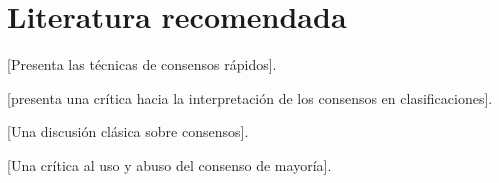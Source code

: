 \section*{Literatura recomendada}

\cite{GoloboffFarris2001} [Presenta las t\'ecnicas de consensos r\'apidos].

\cite{Miyamoto1985} [presenta una cr\'itica hacia la interpretaci\'on de los consensos en clasificaciones].

\cite{NixonCarpenter1996} [Una discusi\'on cl\'asica sobre consensos].

\cite{Sharkey2001} [Una cr\'itica al uso y abuso del consenso de mayor\'ia].
